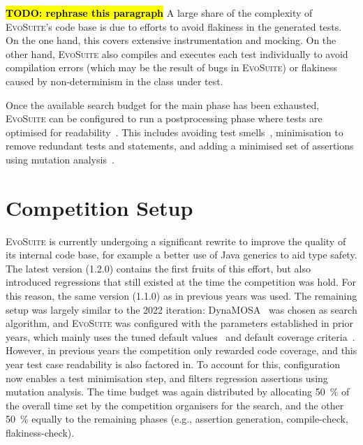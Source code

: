 \documentclass[10pt,conference]{IEEEtran}
\newcommand{\TODO}[1]{\sethlcolor{yellow}\textbf{\textcolor{ScarletRed}{\hl{TODO: #1}}}\xspace}
\newcommand{\TODO}[1]{}
\newcommand{\EVOSUITE}{\textsc{EvoSuite}\xspace}
\begin{document}
\TODO{rephrase this paragraph}
A large share of the complexity of \EVOSUITE's code base is due to efforts to
avoid flakiness in the generated tests. On the one hand, this covers extensive
instrumentation and mocking. On the other hand, \EVOSUITE also compiles and
executes each test individually to avoid compilation errors (which may be the
result of bugs in \EVOSUITE) or flakiness caused by non-determinism in the
class under test.

Once the available search budget for the main phase has been exhausted,
\EVOSUITE can be configured to run a postprocessing phase where tests are optimised for
readability~\cite{FrA11c,FrA13a}. This includes avoiding test
smells~\cite{panichella2020revisiting}, minimisation to remove redundant tests
and statements, and adding a minimised set of assertions using mutation
analysis~\cite{10.1109/TSE.2011.93}.


\section{Competition Setup}\label{sec:setup}

\EVOSUITE is currently undergoing a significant rewrite to improve the quality
of its internal code base, for example a better use of Java generics to aid
type safety. The latest version (1.2.0) contains the first fruits of this effort,
but also introduced regressions that still existed at the time the competition was
hold. For this reason, the same version (1.1.0) as in previous years was used.
The remaining setup was largely similar to the 2022 iteration: DynaMOSA~\cite{dynamosa}
was chosen as search algorithm, and \EVOSUITE was configured with the parameters
established in prior years, which mainly uses the tuned default
values~\cite{arcuri2013parameter} and default coverage criteria~\cite{rojas2015combining}.
%
%
However, in previous years the competition only rewarded code coverage, and this year
test case readability is also factored in. To account for this, configuration now
enables a test minimisation step, and filters regression assertions using mutation analysis.
%
The time budget was again distributed by allocating \SI{50}{\percent} of the overall time
set by the competition organisers for the search, and the other \SI{50}{\percent} equally to
the remaining phases (e.g., assertion generation, compile-check, flakiness-check).
\end{document}

